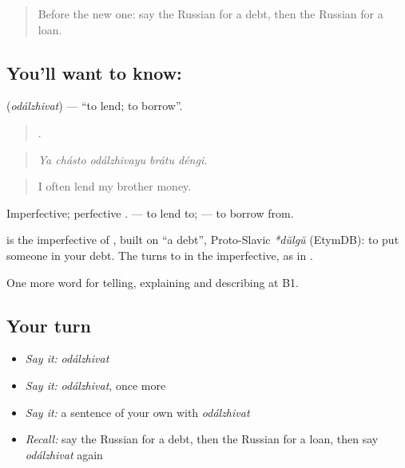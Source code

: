 \begin{quote}
Before the new one: say the Russian for a debt, then the Russian for a loan.
\end{quote}

\subsection*{You'll want to know: }
\textbf{} (\emph{odálzhivat}) — \textquotedblleft{}to lend; to borrow\textquotedblright{}.

\begin{quote}
    .
\end{quote}

\begin{quote}
\emph{Ya chásto odálzhivayu brátu déngi.}
\end{quote}

\begin{quote}
I often lend my brother money.
\end{quote}

Imperfective; perfective \emph{}. \emph{ } — to lend to; \emph{  } — to borrow from.

\begin{cousinweb}
\textbf{} is the imperfective of \emph{}, built on \emph{} \textquotedblleft{}a debt\textquotedblright{}, Proto-Slavic \emph{*dŭlgŭ} (EtymDB): to put someone in your debt. The \emph{} turns to \emph{} in the imperfective, as in \emph{}.
\end{cousinweb}

\begin{grammarlens}[title={What you've built}]
One more word for telling, explaining and describing at B1.
\end{grammarlens}

\subsection*{Your turn}
\begin{itemize}
\raggedright
  \item \emph{Say it:} \emph{odálzhivat}
  \item \emph{Say it:} \emph{odálzhivat}, once more
  \item \emph{Say it:} a sentence of your own with \emph{odálzhivat}
  \item \emph{Recall:} say the Russian for a debt, then the Russian for a loan, then say \emph{odálzhivat} again
\end{itemize}

